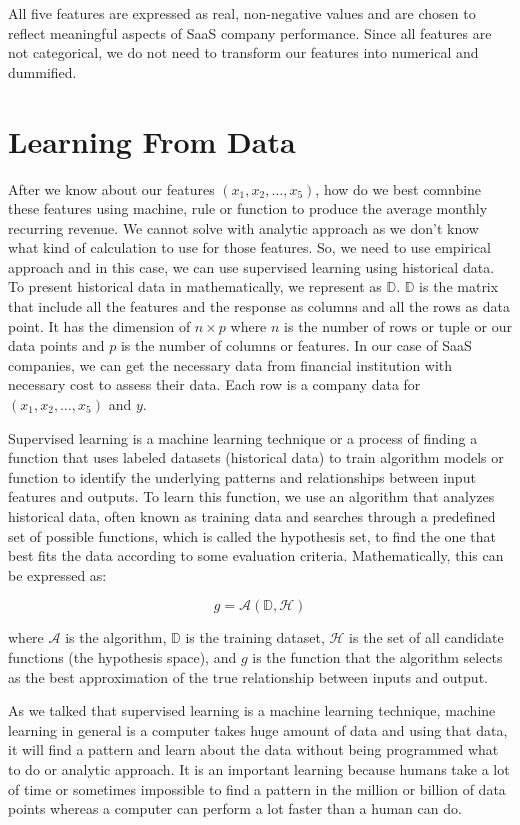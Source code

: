 \documentclass[12pt]{article}
\begin{document}
All five features are expressed as real, non-negative values and are chosen to reflect meaningful aspects of SaaS company performance. Since all features are not categorical, we do not need to transform our features into numerical and dummified. 

\section{Learning From Data}

After we know about our features $(x_1, x_2, \dots, x_5)$, how do we best comnbine these features using machine, rule or function to produce the average monthly recurring revenue. We cannot solve with analytic approach as we don't know what kind of calculation to use for those features. So, we need to use empirical approach and in this case, we can use supervised learning using historical data. To present historical data in mathematically, we represent as $\mathbb{D}$. $\mathbb{D}$ is the matrix that include all the features and the response as columns and all the rows as data point. It has the dimension of $n \times p$ where $n$ is the number of rows or tuple or our data points and $p$ is the number of columns or features. In our case of SaaS companies, we can get the necessary data from financial institution with necessary cost to assess their data. Each row is a company data for $(x_1, x_2, \dots, x_5)$ and $y$. 

Supervised learning is a machine learning technique or a process of finding a function that uses labeled datasets (historical data) to train algorithm models or function to identify the underlying patterns and relationships between input features and outputs. To learn this function, we use an algorithm that analyzes historical data, often known as training data and searches through a predefined set of possible functions, which is called the hypothesis set, to find the one that best fits the data according to some evaluation criteria. Mathematically, this can be expressed as:

\[
g = \mathcal{A}(\mathbb{D}, \mathcal{H})
\]

where $\mathcal{A}$ is the algorithm, $\mathbb{D}$ is the training dataset, $\mathcal{H}$ is the set of all candidate functions (the hypothesis space), and $g$ is the function that the algorithm selects as the best approximation of the true relationship between inputs and output. 

As we talked that supervised learning is a machine learning technique, machine learning in general is a computer takes huge amount of data and using that data, it will find a pattern and learn about the data without being programmed what to do or analytic approach. It is an important learning because humans take a lot of time or sometimes impossible to find a pattern in the million or billion of data points whereas a computer can perform a lot faster than a human can do. 
\end{document}
